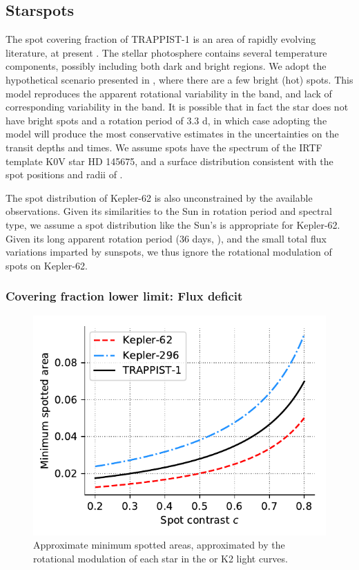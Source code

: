 \subsection{Starspots}

The spot covering fraction of TRAPPIST-1 is an area of rapidly evolving literature, at present \citep{Rackham2018, Morris2018c, Zhang2018, Wakeford2019}. The stellar photosphere contains several temperature components, possibly including both dark and bright regions. We adopt the hypothetical scenario presented in \citet{Morris2018c}, where there are a few bright (hot) spots. This model reproduces the apparent rotational variability in the \kepler band, and lack of corresponding variability in the \spitzer band. It is possible that in fact the star does not have bright spots and a rotation period of 3.3 d, in which case adopting the \citet{Morris2018c} model will produce the most conservative estimates in the uncertainties on the transit depths and times. We assume spots have the spectrum of the IRTF template K0V star HD 145675, and a surface distribution consistent with the spot positions and radii of \citet{Morris2018c}.

The spot distribution of Kepler-62 is also unconstrained by the available observations. Given its similarities to the Sun in rotation period and spectral type, we assume a spot distribution like the Sun's is appropriate for Kepler-62. Given its long apparent rotation period (36 days, \citealt{Borucki2013}), and the small total flux variations imparted by sunspots, we thus ignore the rotational modulation of spots on Kepler-62.

\subsubsection{Covering fraction lower limit: Flux deficit}

\begin{figure}
\centering
\includegraphics[scale=0.8]{libra/flux_deficits.pdf}
\caption{Approximate minimum spotted areas, approximated by the rotational modulation of each star in the \kepler or K2 light curves. }
\label{fig:deficit}
\end{figure}


